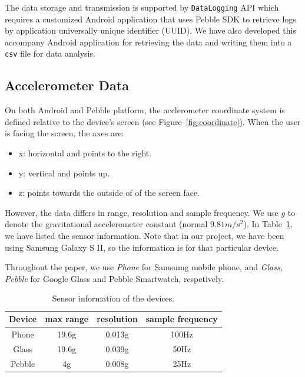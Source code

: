 The data storage and transmission is supported by \texttt{DataLogging} API which requires a customized Android application that uses Pebble SDK to retrieve logs by application universally unique identifier (UUID). We have also developed this accompany Android application for retrieving the data and writing them into a \texttt{csv} file for data analysis.

\subsection{Accelerometer Data}
\label{sec:accelerometer-axes}

On both Android and Pebble platform, the acclerometer coordinate system is defined relative to the device's screen (see Figure~\ref{fig:coordinate}). When the user is facing the screen, the axes are:
\begin{itemize}
\item x: horizontal and points to the right.
\item y: vertical and points up.
\item z: points towards the outside of of the screen face.
\end{itemize}

 


However, the data differs in range, resolution and sample frequency. We use $g$ to denote the gravitational accelerometer constant (normal $9.81 m/s^2$). In Table~\ref{tab:sensorinfo}, we have listed the sensor information. Note that in our project, we have been using Samsung Galaxy S II, so the information is for that particular device. 

Throughout the paper, we use {\em Phone} for Samsumg mobile phone, and {\em Glass}, {\em Pebble} for Google Glass and Pebble Smartwatch, respetively.

\begin{table}
  \centering
  \begin{tabular}{c|c|c|c}
    \hline
    Device & max range & resolution & sample frequency \\
    \hline
    Phone  & 19.6g     & 0.013g     & 100Hz  \\
    Glass  & 19.6g     & 0.039g     & 50Hz   \\
    Pebble & 4g        & 0.008g     & 25Hz   \\
    \hline
  \end{tabular}
  \label{tab:sensorinfo}
  \caption{Sensor information of the devices.}
\end{table}

